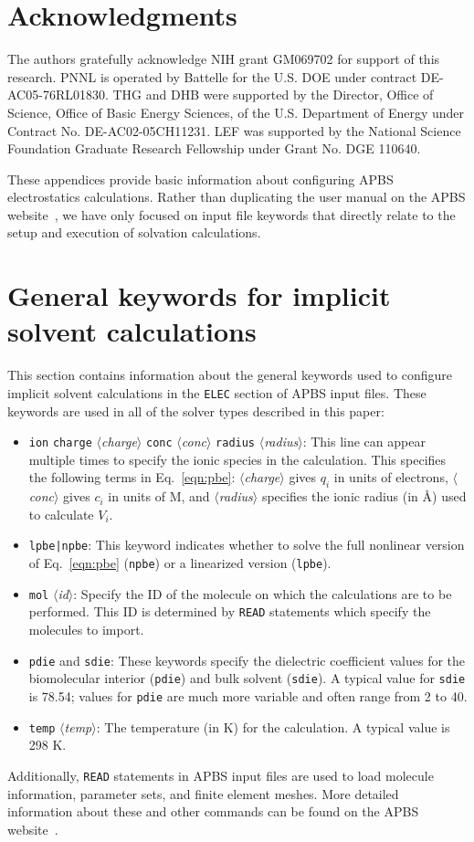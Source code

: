 \documentclass[12pt,titlepage]{article}
\newcommand{\keyword}[1]{\texttt{#1}}
\newcommand{\param}[1]{$\langle$\textit{#1}$\rangle$}
\begin{document}
\section*{Acknowledgments}
The authors gratefully acknowledge NIH grant GM069702 for support of this research.
PNNL is operated by Battelle for the U.S. DOE under contract DE-AC05-76RL01830.  
THG and DHB were supported by the Director, Office of Science, Office of Basic Energy Sciences, of the U.S. Department of Energy under Contract No. DE-AC02-05CH11231.
LEF was supported by the National Science Foundation Graduate Research Fellowship under Grant No. DGE 110640.

\pagebreak
\appendix

These appendices provide basic information about configuring APBS electrostatics calculations. 
Rather than duplicating the user manual on the APBS website~\cite{APBSweb}, we have only focused on input file keywords that directly relate to the setup and execution of solvation calculations.

\section{General keywords for implicit solvent calculations} \label{app:general}
This section contains information about the general keywords used to configure implicit solvent calculations in the \keyword{ELEC} section of APBS input files.
These keywords are used in all of the solver types described in this paper:
\begin{itemize}
	\item \keyword{ion} \keyword{charge} \param{charge} \keyword{conc} \param{conc} \keyword{radius} \param{radius}:  This line can appear multiple times to specify the ionic species in the calculation.
	This specifies the following terms in Eq.~\ref{eqn:pbe}: \param{charge} gives $q_i$ in units of electrons, \param{conc} gives $c_i$ in units of M, and \param{radius} specifies the ionic radius (in \AA) used to calculate $V_i$.
	\item \keyword{lpbe|npbe}: This keyword indicates whether to solve the full nonlinear version of Eq.~\ref{eqn:pbe} (\keyword{npbe}) or a linearized version (\keyword{lpbe}).
	\item \keyword{mol} \param{id}:  Specify the ID of the molecule on which the calculations are to be performed.
	This ID is determined by \keyword{READ} statements which specify the molecules to import.
	\item \keyword{pdie} and \keyword{sdie}:  These keywords specify the di\-elec\-tric coefficient values for the bio\-mol\-ec\-ular interior (\keyword{pdie}) and bulk solvent (\keyword{sdie}).
	A typical value for \keyword{sdie} is 78.54; values for \keyword{pdie} are much more variable and often range from 2 to 40.
	\item \keyword{temp} \param{temp}:  The temperature (in K) for the calculation.  A typical value is 298 K.
\end{itemize}
Additionally, \keyword{READ} statements in APBS input files are used to load molecule information, parameter sets, and finite element meshes.
More detailed information about these and other commands can be found on the APBS website~\cite{APBSweb}.
\end{document}
